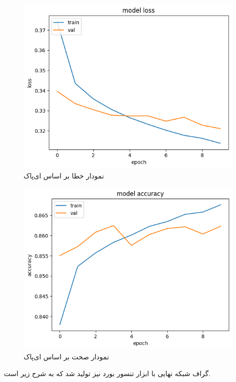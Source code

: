 \documentclass{article}
\begin{document}
\begin{figure}[!h]
    \centering\includegraphics[scale=.55]{./p3-1}
    \caption{نمودار خطا بر اساس ای‌پاک}\label{fig.31}
\end{figure}


\begin{figure}[!h]
    \centering\includegraphics[scale=.55]{./p3-2}
    \caption{نمودار صحت بر اساس ای‌پاک}\label{fig.32}
\end{figure}


گراف شبکه نهایی با ابزار تنسور بورد نیز تولید شد که به شرح زیر است.
\end{document}
